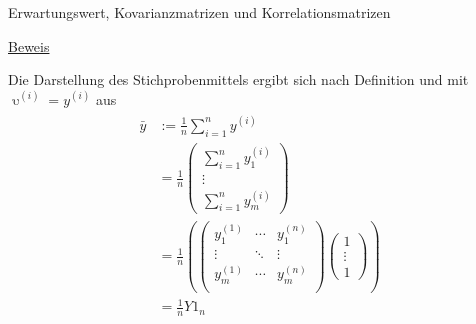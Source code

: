 \documentclass[
  8pt,
  ignorenonframetext,
]{beamer}
\DeclareMathOperator*{\ups}{\upsilon}
\begin{document}
\begin{frame}{Erwartungswert, Kovarianzmatrizen und
Korrelationsmatrizen}
\protect\hypertarget{erwartungswert-kovarianzmatrizen-und-korrelationsmatrizen-8}{}
\footnotesize

\underline{Beweis} \vspace{1mm}

Die Darstellung des Stichprobenmittels ergibt sich nach Definition und
mit \({\ups}^{(i)} = y^{(i)}\) aus \begin{align}
\begin{split}
\bar{y} 
& := \frac{1}{n} \sum_{i=1}^n {y}^{(i)} \\
&  = \frac{1}{n}\begin{pmatrix} \sum_{i=1}^n y_1^{(i)} \\ \vdots \\ \sum_{i=1}^n y_m^{(i)} \end{pmatrix} \\
&  = \frac{1}{n}\left(\begin{pmatrix} y_1^{(1)} & \cdots  & y_1^{(n)} \\
                                      \vdots    & \ddots  & \vdots     \\
                                      y_m^{(1)} & \cdots  & y_m^{(n)} \\
                   \end{pmatrix}
                   \begin{pmatrix} 1 \\ \vdots \\ 1 \end{pmatrix}
              \right) \\
& = \frac{1}{n}Y1_{n} \\
\end{split}
\end{align}
\end{frame}
\end{document}
